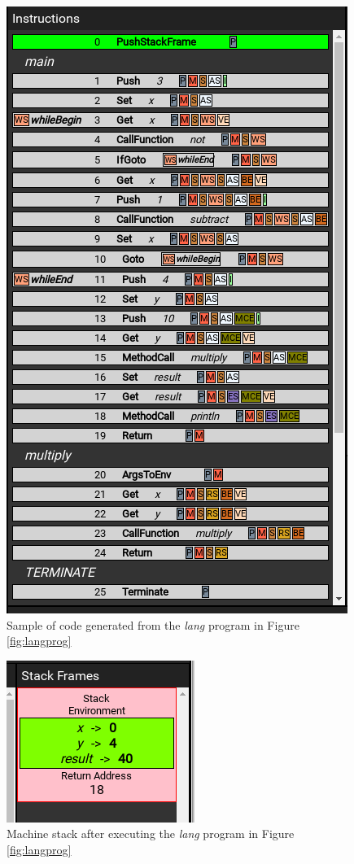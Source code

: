 \begin{figure}[H]
\centering
\includegraphics[scale=0.5]{graphics/langcode} %
\caption{Sample of code generated from the \textit{lang} program in Figure \ref{fig:langprog}}
\label{fig:langcode} %
\end{figure}

\begin{figure}[H]
\centering
\includegraphics[scale=0.5]{graphics/langstack} %
\caption{Machine stack after executing the \textit{lang} program in Figure \ref{fig:langprog}}
\label{fig:langstack} %
\end{figure}

